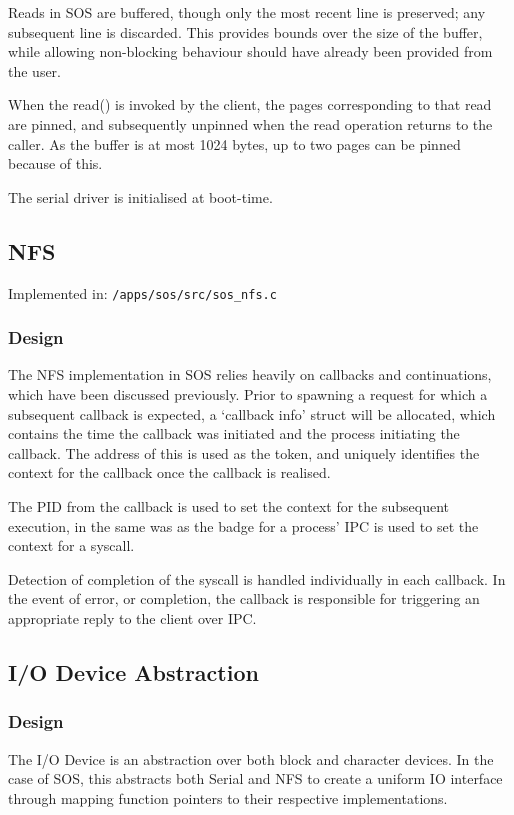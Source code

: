 \documentclass[a4paper,12pt]{article}
\begin{document}
Reads in SOS are buffered, though only the most recent line is preserved; any
subsequent line is discarded.  This provides bounds over the size of the
buffer, while allowing non-blocking behaviour should have already been
provided from the user.

When the read() is invoked by the client, the pages corresponding to that read
are pinned, and subsequently unpinned when the read operation returns to the
caller.  As the buffer is at most 1024 bytes, up to two pages can be pinned
because of this.

The serial driver is initialised at boot-time.

\subsection{NFS}
Implemented in: \texttt{/apps/sos/src/sos\_nfs.c}

\subsubsection{Design}
The NFS implementation in SOS relies heavily on callbacks and continuations,
which have been discussed previously.  Prior to spawning a request for which a
subsequent callback is expected, a `callback info' struct will be allocated,
which contains the time the callback was initiated and the process initiating
the callback.  The address of this is used as the token, and uniquely
identifies the context for the callback once the callback is realised.

The PID from the callback is used to set the context for the subsequent
execution, in the same was as the badge for a process' IPC is used to set the
context for a syscall.

Detection of completion of the syscall is handled individually in each
callback.  In the event of error, or completion, the callback is responsible
for triggering an appropriate reply to the client over IPC.

\subsection{I/O Device Abstraction}
\subsubsection{Design}
The I/O Device is an abstraction over both block and character devices.  In
the case of SOS, this abstracts both Serial and NFS to create a uniform IO
interface through mapping function pointers to their respective
implementations.
\end{document}
